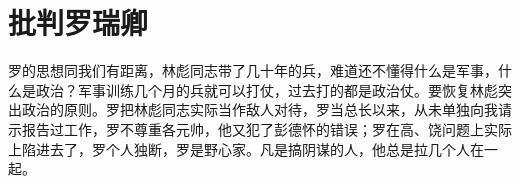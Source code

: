 \section[批判罗瑞卿（一九六五年十二月二日）]{批判罗瑞卿}


罗的思想同我们有距离，林彪同志带了几十年的兵，难道还不懂得什么是军事，什么是政治？军事训练几个月的兵就可以打仗，过去打的都是政治仗。要恢复林彪突出政治的原则。罗把林彪同志实际当作敌人对待，罗当总长以来，从未单独向我请示报告过工作，罗不尊重各元帅，他又犯了彭德怀的错误；罗在高、饶问题上实际上陷进去了，罗个人独断，罗是野心家。凡是搞阴谋的人，他总是拉几个人在一起。


